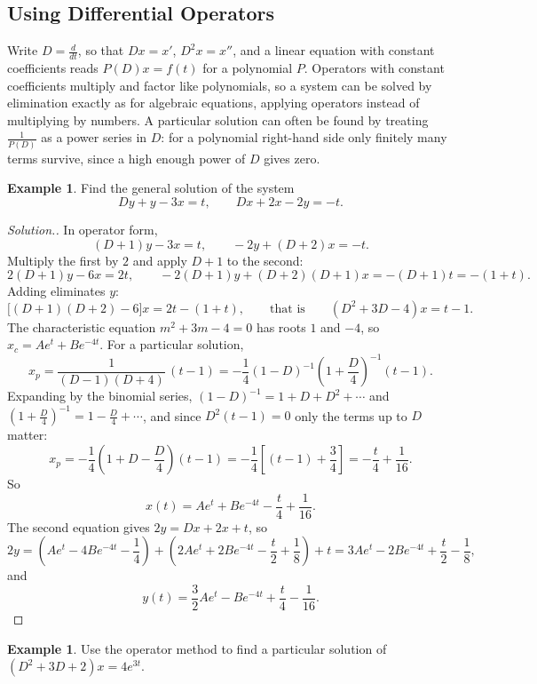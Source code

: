 \documentclass[11pt,a4paper]{article}
\theoremstyle{definition}
\newtheorem{exa}[thm]{Example}
\newenvironment{solution}
  {\renewcommand{\qedsymbol}{}\begin{proof}[\textit{Solution}.]}
  {\end{proof}}
\begin{document}
{\color[wave]{485}\subsection{Using Differential Operators}}

Write $D = \frac{d}{dt}$, so that $Dx = x'$, $D^2x = x''$, and a linear equation
with constant coefficients reads $P(D)x = f(t)$ for a polynomial $P$. Operators
with constant coefficients multiply and factor like polynomials, so a system can
be solved by elimination exactly as for algebraic equations, applying operators
instead of multiplying by numbers. A particular solution can often be found by
treating $\frac{1}{P(D)}$ as a power series in $D$: for a polynomial right-hand
side only finitely many terms survive, since a high enough power of $D$ gives
zero.

\begin{exa}
\label{ex:operatorsystem}
Find the general solution of the system
\[Dy + y -3x = t ,\qquad Dx + 2x - 2y = -t .\]
\end{exa}

\begin{solution}
In operator form,
\[(D + 1) y - 3x = t ,\qquad -2y + (D + 2)x = -t .\]
Multiply the first by $2$ and apply $D + 1$ to the second:
\[2(D + 1)y - 6x = 2t ,\qquad -2(D + 1)y + (D + 2)(D + 1)x = -(D + 1)t = -(1 +
t) .\]
Adding eliminates $y$:
\[\big[(D + 1)(D + 2) - 6\big]x = 2t - (1 + t),\qquad\text{that is}\qquad (D^2 +
3D - 4) x = t - 1 .\]
The characteristic equation $m^2 + 3m - 4 = 0$ has roots $1$ and $-4$, so
$x_c = A e^{t} + B e^{-4t}$. For a particular solution,
\[x_p = \frac{1}{(D - 1)(D + 4)}\,(t-1) = -\frac{1}{4}(1 - D)^{-1}\left(1 +
\frac{D}{4}\right)^{-1}(t-1) .\]
Expanding by the binomial series, $(1 - D)^{-1} = 1 + D + D^2 + \cdots$ and
$\left(1 + \frac{D}{4}\right)^{-1} = 1 - \frac{D}{4} + \cdots$, and since
$D^2(t-1) = 0$ only the terms up to $D$ matter:
\[x_p = -\frac{1}{4}\left( 1 + D - \frac{D}{4}\right) (t-1) =
-\frac{1}{4}\left[(t-1) + \frac34\right] = -\frac{t}{4} + \frac{1}{16} .\]
So
\[x(t) = Ae^t + Be^{-4t} - \frac{t}{4} + \frac{1}{16} .\]
The second equation gives $2y = Dx + 2x + t$, so
\[2y = \left(Ae^t - 4Be^{-4t} - \frac14\right) + \left(2Ae^t + 2Be^{-4t} -
\frac{t}{2} + \frac18\right) + t = 3Ae^t - 2Be^{-4t} + \frac{t}{2} - \frac{1}{8}
,\]
and
\[y(t) = \frac{3}{2}Ae^t - B e^{-4t} + \frac{t}{4} - \frac{1}{16} .\]
\end{solution}

\begin{exa}
\label{ex:operatorexp}
Use the operator method to find a particular solution of
$(D^2 + 3D + 2)x = 4e^{3t}$.
\end{exa}
\end{document}
